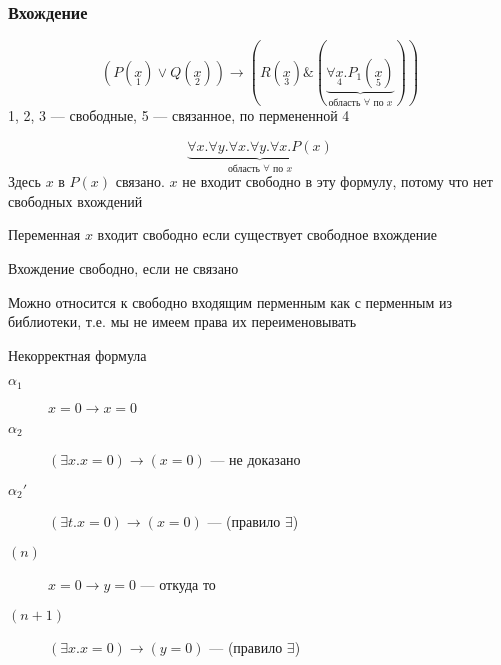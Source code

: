 \documentclass[english]{article}
\begin{document}
\subsubsection{Вхождение}
\label{sec:org56a14f1}
\begin{examp}
	\[ (P(\underset{1}{x}) \vee Q(\underset{2}{x})) \to (R(\underset{3}{x}) \& (\underbrace{\forall \underset{4}{x}. P_1(\underset{5}{x})}_{\text{область }\forall\text{ по }x})) \]
	1, 2, 3 --- свободные, 5 --- связанное, по пермененной 4
\end{examp}
\begin{examp}
	\[ \underbrace{\forall x. \forall y. \forall x. \forall y. \forall x. P(x)}_{\text{область }\forall\text{ по }x} \]
	Здесь \(x\) в \(P(x)\) связано. \(x\) не входит свободно в эту формулу, потому что нет свободных вхождений
\end{examp}
\begin{definition}
	Переменная \(x\) входит свободно если существует свободное вхождение
\end{definition}
\begin{definition}
	Вхождение свободно, если не связано
\end{definition}
Можно относится к свободно входящим перменным как с перменным из библиотеки, т.е. мы не имеем права их переименовывать
\begin{examp}
	Некорректная формула
	\begin{description}
		\item[{\(\alpha_1\)}] \(x = 0 \to x = 0\)
		\item[{\(\alpha_2\)}] \color{red}\((\exists x. x = 0) \to (x = 0)\) --- не доказано\color{black}
		\item[{\(\alpha_2'\)}] \((\exists t. x = 0) \to (x = 0)\) --- (правило \(\exists\))
	\end{description}
\end{examp}
\begin{examp}
	\-
	\begin{description}
		\item[{\((n)\)}] \(x = 0 \to y = 0\) --- откуда то
		\item[{\((n + 1)\)}] \((\exists x. x = 0) \to (y = 0)\) --- (правило \(\exists\))
	\end{description}
\end{examp}
\end{document}
